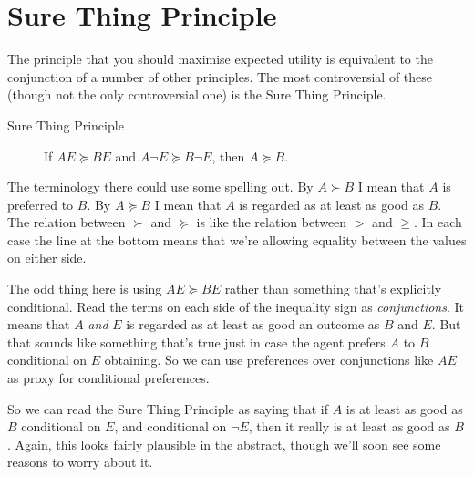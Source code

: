 
\usepackage{bm}
\usepackage{nicefrac}
\def\mytitle{Mixed Strategies}
\def\myauthor{Brian Weatherson}
\def\mydate{February 6, 2018}


\newcommand{\starttab}{\begin{center}
\vspace{6pt}
\begin{tabular}}

\newcommand{\stoptab}{\end{tabular}
\vspace{6pt}
\end{center}
\noindent}

\newcommand{\tol}[1]{$\langle #1 \rangle$}

\section{Sure Thing Principle}
The principle that you should maximise expected utility is equivalent to the conjunction of a number of other principles. The most controversial of these (though not the only controversial one) is the Sure Thing Principle.

\begin{description}
\item[Sure Thing Principle] If $AE \succeq BE$ and $A \neg E \succeq B \neg E$, then $A \succeq B$.
\end{description}
The terminology there could use some spelling out. By $A \succ B$ I mean that $A$ is preferred to $B$. By $A \succeq B$ I mean that $A$ is regarded as at least as good as $B$. The relation between $\succ$ and $\succeq$ is like the relation between $>$ and $\geq$. In each case the line at the bottom means that we're allowing equality between the values on either side.

The odd thing here is using $AE \succeq BE$ rather than something that's explicitly conditional. Read the terms on each side of the inequality sign as \textit{conjunctions}. It means that $A$ \textit{and} $E$ is regarded as at least as good an outcome as $B$ and $E$. But that sounds like something that's true just in case the agent prefers $A$ to $B$ conditional on $E$ obtaining. So we can use preferences over conjunctions like $AE$ as proxy for conditional preferences.

So we can read the Sure Thing Principle as saying that if $A$ is at least as good as $B$ conditional on $E$, and conditional on $\neg E$, then it really is at least as good as $B$. Again, this looks fairly plausible in the abstract, though we'll soon see some reasons to worry about it.

